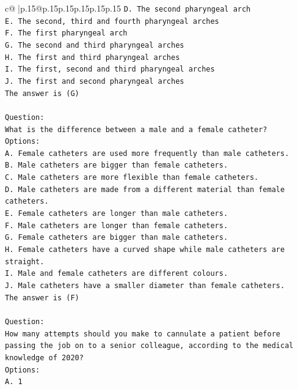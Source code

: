 \documentclass{article}
\begin{document}
{\begin{supertabular}{c@{$\;$}|p{.15\linewidth}@{}p{.15\linewidth}p{.15\linewidth}p{.15\linewidth}p{.15\linewidth}p{.15\linewidth}}
{{{\texttt{D. The second pharyngeal arch} \\
\texttt{E. The second, third and fourth pharyngeal arches} \\
\texttt{F. The first pharyngeal arch} \\
\texttt{G. The second and third pharyngeal arches} \\
\texttt{H. The first and third pharyngeal arches} \\
\texttt{I. The first, second and third pharyngeal arches} \\
\texttt{J. The first and second pharyngeal arches} \\
\texttt{The answer is (G)} \\
\\ 
\texttt{Question:} \\
\texttt{What is the difference between a male and a female catheter?} \\
\texttt{Options:} \\
\texttt{A. Female catheters are used more frequently than male catheters.} \\
\texttt{B. Male catheters are bigger than female catheters.} \\
\texttt{C. Male catheters are more flexible than female catheters.} \\
\texttt{D. Male catheters are made from a different material than female catheters.} \\
\texttt{E. Female catheters are longer than male catheters.} \\
\texttt{F. Male catheters are longer than female catheters.} \\
\texttt{G. Female catheters are bigger than male catheters.} \\
\texttt{H. Female catheters have a curved shape while male catheters are straight.} \\
\texttt{I. Male and female catheters are different colours.} \\
\texttt{J. Male catheters have a smaller diameter than female catheters.} \\
\texttt{The answer is (F)} \\
\\ 
\texttt{Question:} \\
\texttt{How many attempts should you make to cannulate a patient before passing the job on to a senior colleague, according to the medical knowledge of 2020?} \\
\texttt{Options:} \\
\texttt{A. 1} \\
}}}
\end{supertabular}}
\end{document}
